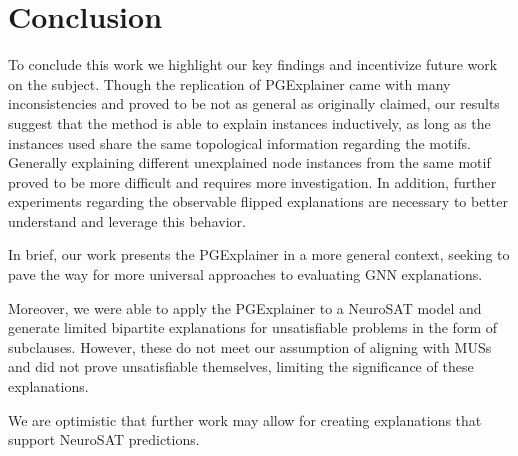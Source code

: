 \chapter{Conclusion}

To conclude this work we highlight our key findings and incentivize future work on the subject.
Though the replication of PGExplainer came with many inconsistencies and proved to be not as general as originally claimed, our results suggest that the method is able to explain instances inductively, as long as the instances used share the same topological information regarding the motifs. Generally explaining different unexplained node instances from the same motif proved to be more difficult and requires more investigation. In addition, further experiments regarding the observable flipped explanations are necessary to better understand and leverage this behavior. 

In brief, our work presents the PGExplainer in a more general context, seeking to pave the way for more universal approaches to evaluating GNN explanations.

Moreover, we were able to apply the PGExplainer to a NeuroSAT model and generate limited bipartite explanations for unsatisfiable problems in the form of subclauses. However, these do not meet our assumption of aligning with \acp{MUS} and did not prove unsatisfiable themselves, limiting the significance of these explanations.

We are optimistic that further work may allow for creating explanations that support NeuroSAT predictions.
